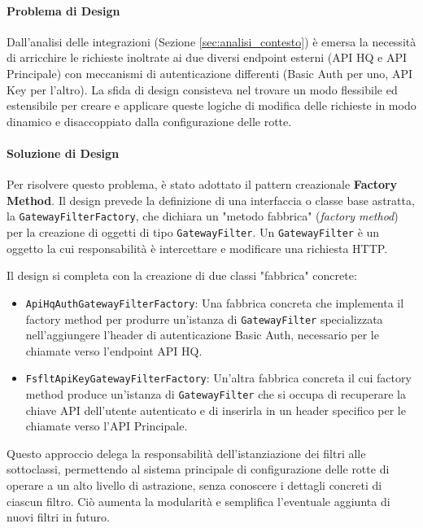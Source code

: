 \documentclass[12pt,a4paper,openright,twoside]{book}
\begin{document}
\paragraph{Problema di Design}
Dall'analisi delle integrazioni (Sezione \ref{sec:analisi_contesto}) è emersa la necessità di arricchire le richieste inoltrate ai due diversi endpoint esterni (API HQ e API Principale) con meccanismi di autenticazione differenti (Basic Auth per uno, API Key per l'altro). La sfida di design consisteva nel trovare un modo flessibile ed estensibile per creare e applicare queste logiche di modifica delle richieste in modo dinamico e disaccoppiato dalla configurazione delle rotte.


\paragraph{Soluzione di Design}
Per risolvere questo problema, è stato adottato il pattern creazionale \textbf{Factory Method}. Il design prevede la definizione di una interfaccia o classe base astratta, la \texttt{GatewayFilterFactory}, che dichiara un "metodo fabbrica" (\textit{factory method}) per la creazione di oggetti di tipo \texttt{GatewayFilter}. Un \texttt{GatewayFilter} è un oggetto la cui responsabilità è intercettare e modificare una richiesta HTTP.

Il design si completa con la creazione di due classi "fabbrica" concrete:
\begin{itemize}
    \item \texttt{ApiHqAuthGatewayFilterFactory}: Una fabbrica concreta che implementa il factory method per produrre un'istanza di \texttt{GatewayFilter} specializzata nell'aggiungere l'header di autenticazione Basic Auth, necessario per le chiamate verso l'endpoint API HQ.
    \item \texttt{FsfltApiKeyGatewayFilterFactory}: Un'altra fabbrica concreta il cui factory method produce un'istanza di \texttt{GatewayFilter} che si occupa di recuperare la chiave API dell'utente autenticato e di inserirla in un header specifico per le chiamate verso l'API Principale.
\end{itemize}
Questo approccio delega la responsabilità dell'istanziazione dei filtri alle sottoclassi, permettendo al sistema principale di configurazione delle rotte di operare a un alto livello di astrazione, senza conoscere i dettagli concreti di ciascun filtro. Ciò aumenta la modularità e semplifica l'eventuale aggiunta di nuovi filtri in futuro.
\end{document}
